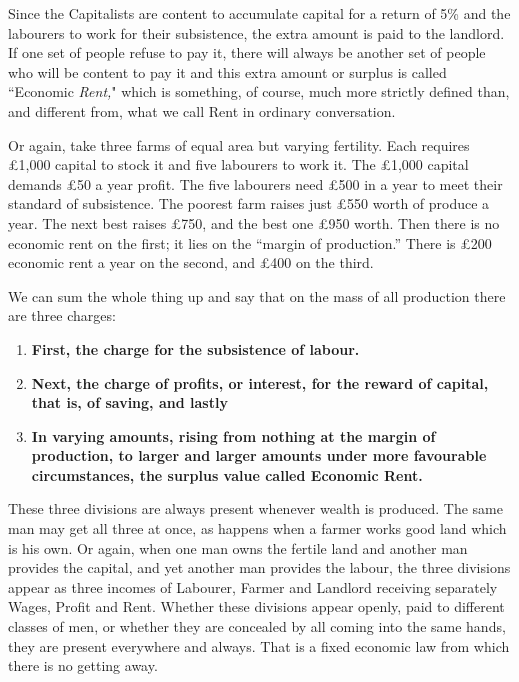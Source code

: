 \documentclass{book}
\begin{document}
Since the Capitalists are content to accumulate capital for a return of 5\% and the labourers to work for their subsistence, the extra amount is paid to the landlord. If one set of people refuse to pay it, there will always be another set of people who will be content to pay it and this extra amount or surplus is called “Economic \emph{Rent,}" which is something, of course, much more strictly defined than, and different from, what we call Rent in ordinary conversation.

Or again, take three farms of equal area but varying fertility. Each requires £1,000 capital to stock it and five labourers to work it. The £1,000 capital demands £50 a year profit. The five labourers need £500 in a year to meet their standard of subsistence. The poorest farm raises just £550 worth of produce a year. The next best raises £750, and the best one £950 worth. Then there is no economic rent on the first; it lies on the “margin of production.” There is £200 economic rent a year on the second, and £400 on the third.

We can sum the whole thing up and say that on the mass of all production there are three charges:

\begin{enumerate}
	\item \textbf{First, the charge for the subsistence of labour.}


	\item \textbf{Next, the charge of profits, or interest, for the reward of capital, that is, of saving, and lastly}


	\item \textbf{In varying amounts, rising from nothing at the margin of production, to larger and larger amounts under more favourable circumstances, the surplus value called Economic Rent.}



\end{enumerate}
These three divisions are always present whenever wealth is produced. The same man may get all three at once, as happens when a farmer works good land which is his own. Or again, when one man owns the fertile land and another man provides the capital, and yet another man provides the labour, the three divisions appear as three incomes of Labourer, Farmer and Landlord receiving separately Wages, Profit and Rent. Whether these divisions appear openly, paid to different classes of men, or whether they are concealed by all coming into the same hands, they are present everywhere and always. That is a fixed economic law from which there is no getting away.
\end{document}
